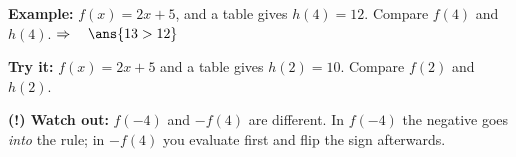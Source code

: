 \documentclass[12pt]{article}
\begin{document}
\begin{examplebox}
\textbf{Example:} \quad $f(x) = 2x + 5$, and a table gives $h(4) = 12$. Compare $f(4)$ and $h(4)$.
$\Rightarrow\quad \ans{13 > 12}$
\end{examplebox}

\begin{tryitbox}
\textbf{Try it:} \quad $f(x) = 2x + 5$ and a table gives $h(2) = 10$. Compare $f(2)$ and $h(2)$.\\[2pt]
\end{tryitbox}

\begin{watchoutbox}
\textbf{(!) Watch out:} $f(-4)$ and $-f(4)$ are different. In $f(-4)$ the negative goes
\textit{into} the rule; in $-f(4)$ you evaluate first and flip the sign afterwards.
\end{watchoutbox}
\end{document}
